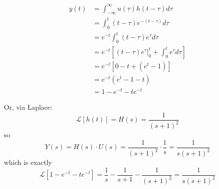 \documentclass[12pt]{article}
\renewcommand{\L}{\mathcal{L}}
\begin{document}
    \color{darkblue}
        \begin{align*}
            y(t) &= \int_{-\infty}^{\infty} u(\tau) h(t - \tau) d\tau \\
            &= \int_{0}^{t} (t - \tau) e^{-(t - \tau)} d\tau \\
            &= e^{-t} \int_{0}^{t} (t - \tau) e^{\tau} d\tau \\
            &= e^{-t} \left[ (t - \tau) e^{\tau} \Big|_{0}^{t} + \int_{0}^{t} e^{\tau} d\tau \right] \\
            &= e^{-t} \left[ 0 - t + (e^{t} - 1) \right] \\
            &= e^{-t} (e^{t} - 1 - t) \\
            &= \boxed{1 - e^{-t} - t e^{-t}}
        \end{align*}

        Or, via Laplace:
        \[\L[h(t)] = H(s) = \frac{1}{(s+1)^2}\]
        so 
        \[Y(s) = H(s) \cdot U(s) = \frac{1}{(s+1)^2} \cdot \frac{1}{s} = \frac{1}{s(s+1)^2}\]
        which is exactly 
        \[\L[ 1 - e^{-t} - t e^{-t}] = \frac{1}{s} -\frac{1}{s + 1} - \frac{1}{(s+1)^2} = \frac{1}{s(s+1)^2}\]
    \color{black}
\end{document}
